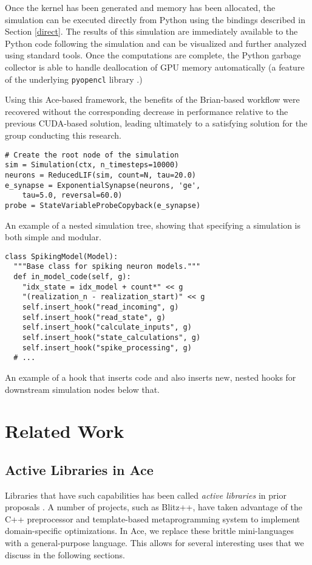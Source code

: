 \documentclass[10pt, conference, compsocconf]{IEEEtran}
\begin{document}
Once the kernel has been generated and memory has been allocated, the simulation can be executed directly from Python using the bindings described in Section \ref{direct}. The results of this simulation are immediately available to the Python code following the simulation and can be visualized and further analyzed using standard tools. Once the computations are complete, the Python garbage collector is able to handle deallocation of GPU memory automatically (a feature of the underlying \verb|pyopencl| library \cite{klockner2011pycuda}.)

Using this Ace-based framework, the benefits of the Brian-based workflow were recovered without the  corresponding decrease in performance relative to the previous CUDA-based solution, leading ultimately to a satisfying solution for the group conducting this research.

\begin{codelisting}
\begin{lstlisting}
# Create the root node of the simulation
sim = Simulation(ctx, n_timesteps=10000)
neurons = ReducedLIF(sim, count=N, tau=20.0)
e_synapse = ExponentialSynapse(neurons, 'ge',
    tau=5.0, reversal=60.0)
probe = StateVariableProbeCopyback(e_synapse)
\end{lstlisting}
\caption{An example of a nested simulation tree, showing that specifying a simulation is both simple and modular.}
\label{spec}
\end{codelisting}

\begin{codelisting}
\begin{lstlisting}
class SpikingModel(Model):
  """Base class for spiking neuron models."""
  def in_model_code(self, g):
    "idx_state = idx_model + count*" << g
    "(realization_n - realization_start)" << g
    self.insert_hook("read_incoming", g)
    self.insert_hook("read_state", g)
    self.insert_hook("calculate_inputs", g)
    self.insert_hook("state_calculations", g)
    self.insert_hook("spike_processing", g)
  # ...
\end{lstlisting}
\caption{An example of a hook that inserts code and also inserts new, nested hooks for downstream simulation nodes  below that.}
\label{impl}
\end{codelisting}

\section{Related Work}
\subsection{Active Libraries in Ace}
Libraries that have such capabilities has been called {\it active libraries} in prior proposals \cite{activelibraries}. A number of  projects, such as Blitz++, have taken advantage of the C++ preprocessor and template-based metaprogramming system to implement domain-specific optimizations. In Ace, we replace these brittle mini-languages with a general-purpose language. This allows for several interesting uses that we discuss in the following sections.
\end{document}
